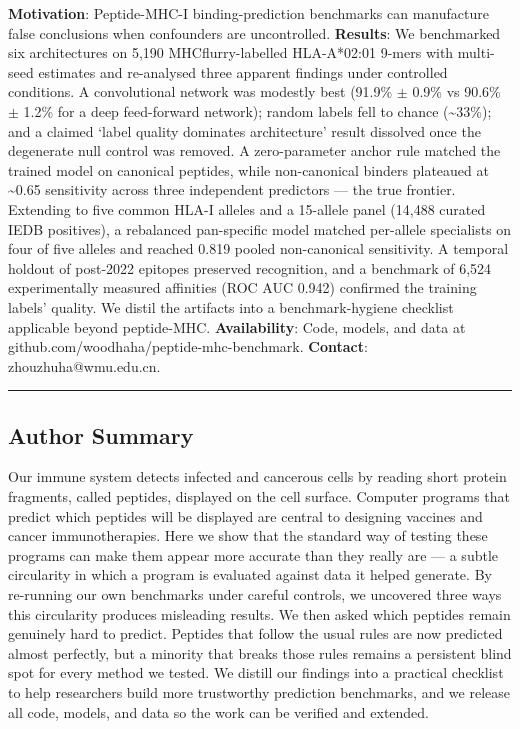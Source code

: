 \documentclass[10pt]{article}
\begin{document}
\textbf{Motivation}: Peptide-MHC-I binding-prediction benchmarks can
manufacture false conclusions when confounders are uncontrolled.
\textbf{Results}: We benchmarked six architectures on 5,190
MHCflurry-labelled HLA-A*02:01 9-mers with multi-seed estimates and
re-analysed three apparent findings under controlled conditions. A
convolutional network was modestly best (91.9\% $\pm$ 0.9\% vs 90.6\% $\pm$
1.2\% for a deep feed-forward network); random labels fell to chance
(\textasciitilde33\%); and a claimed `label quality dominates
architecture' result dissolved once the degenerate null control was
removed. A zero-parameter anchor rule matched the trained model on
canonical peptides, while non-canonical binders plateaued at
\textasciitilde0.65 sensitivity across three independent predictors ---
the true frontier. Extending to five common HLA-I alleles and a
15-allele panel (14,488 curated IEDB positives), a rebalanced
pan-specific model matched per-allele specialists on four of five
alleles and reached 0.819 pooled non-canonical sensitivity. A temporal
holdout of post-2022 epitopes preserved recognition, and a benchmark of
6,524 experimentally measured affinities (ROC AUC 0.942) confirmed the
training labels' quality. We distil the artifacts into a
benchmark-hygiene checklist applicable beyond peptide-MHC.
\textbf{Availability}: Code, models, and data at
github.com/woodhaha/peptide-mhc-benchmark. \textbf{Contact}:
zhouzhuha@wmu.edu.cn.

\begin{center}\rule{0.5\linewidth}{0.5pt}\end{center}

\subsection{Author Summary}\label{author-summary}

Our immune system detects infected and cancerous cells by reading short protein fragments, called peptides, displayed on the cell surface. Computer programs that predict which peptides will be displayed are central to designing vaccines and cancer immunotherapies. Here we show that the standard way of testing these programs can make them appear more accurate than they really are --- a subtle circularity in which a program is evaluated against data it helped generate. By re-running our own benchmarks under careful controls, we uncovered three ways this circularity produces misleading results. We then asked which peptides remain genuinely hard to predict. Peptides that follow the usual rules are now predicted almost perfectly, but a minority that breaks those rules remains a persistent blind spot for every method we tested. We distill our findings into a practical checklist to help researchers build more trustworthy prediction benchmarks, and we release all code, models, and data so the work can be verified and extended.
\end{document}
